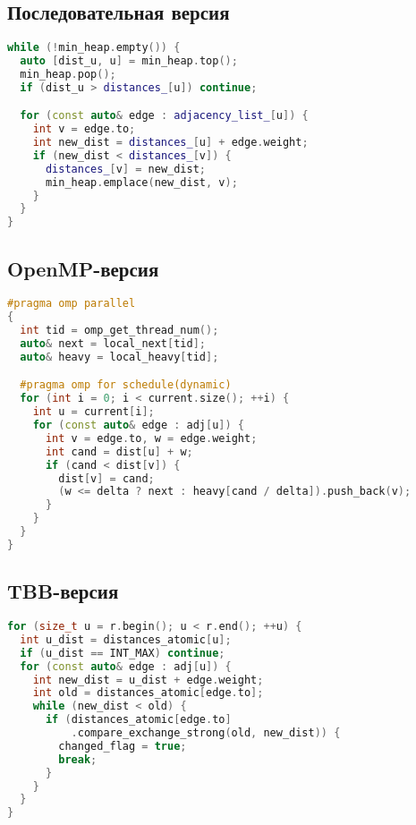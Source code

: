 \documentclass[12pt,a4paper]{extarticle}
\begin{document}
\subsection{Последовательная версия}

\begin{lstlisting}[language=C++, caption={RunImpl для последовательной версии}]
while (!min_heap.empty()) {
  auto [dist_u, u] = min_heap.top();
  min_heap.pop();
  if (dist_u > distances_[u]) continue;

  for (const auto& edge : adjacency_list_[u]) {
    int v = edge.to;
    int new_dist = distances_[u] + edge.weight;
    if (new_dist < distances_[v]) {
      distances_[v] = new_dist;
      min_heap.emplace(new_dist, v);
    }
  }
}
\end{lstlisting}

\subsection{OpenMP-версия}

\begin{lstlisting}[language=C++, caption={Параллельная обработка вершины}]
#pragma omp parallel
{
  int tid = omp_get_thread_num();
  auto& next = local_next[tid];
  auto& heavy = local_heavy[tid];

  #pragma omp for schedule(dynamic)
  for (int i = 0; i < current.size(); ++i) {
    int u = current[i];
    for (const auto& edge : adj[u]) {
      int v = edge.to, w = edge.weight;
      int cand = dist[u] + w;
      if (cand < dist[v]) {
        dist[v] = cand;
        (w <= delta ? next : heavy[cand / delta]).push_back(v);
      }
    }
  }
}
\end{lstlisting}

\subsection{TBB-версия}

\begin{lstlisting}[language=C++, caption={UpdateDistancesInBlock}]
for (size_t u = r.begin(); u < r.end(); ++u) {
  int u_dist = distances_atomic[u];
  if (u_dist == INT_MAX) continue;
  for (const auto& edge : adj[u]) {
    int new_dist = u_dist + edge.weight;
    int old = distances_atomic[edge.to];
    while (new_dist < old) {
      if (distances_atomic[edge.to]
          .compare_exchange_strong(old, new_dist)) {
        changed_flag = true;
        break;
      }
    }
  }
}
\end{lstlisting}
\end{document}
